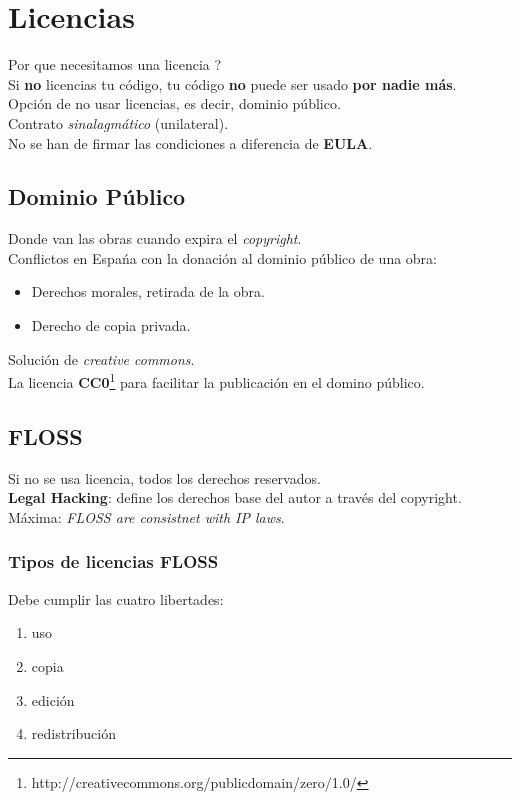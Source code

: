 \documentclass[11pt]{scrartcl}
\begin{document}
\section{Licencias}

Por que necesitamos una licencia ?\\
Si \textbf{no} licencias tu c\'odigo, tu c\'odigo \textbf{no} puede ser usado \textbf{por nadie m\'as}.\\
Opci\'on de no usar licencias, es decir, dominio p\'ublico.\\
Contrato \emph{sinalagm\'atico} (unilateral).\\
No se han de firmar las condiciones a diferencia de \textbf{EULA}.

\subsection{Dominio P\'ublico}

Donde van las obras cuando expira el \emph{copyright}.\\
Conflictos en Espa\'na con la donaci\'on al dominio p\'ublico de una obra:
\begin{itemize}
	\item Derechos morales, retirada de la obra.
	\item Derecho de copia privada.
\end{itemize}
Soluci\'on de \emph{creative commons}.\\
La licencia \textbf{CC0}\footnote{http://creativecommons.org/publicdomain/zero/1.0/} para facilitar la publicaci\'on en el domino p\'ublico.

\subsection{FLOSS}

Si no se usa licencia, todos los derechos reservados.\\
\textbf{Legal Hacking}: define los derechos base del autor a trav\'es del copyright.\\
M\'axima: \emph{FLOSS are consistnet with IP laws}.

\subsubsection{Tipos de licencias FLOSS}

Debe cumplir las cuatro libertades:
\begin{enumerate}
	\item uso
	\item copia
	\item edici\'on
	\item redistribuci\'on
\end{enumerate}
\end{document}

